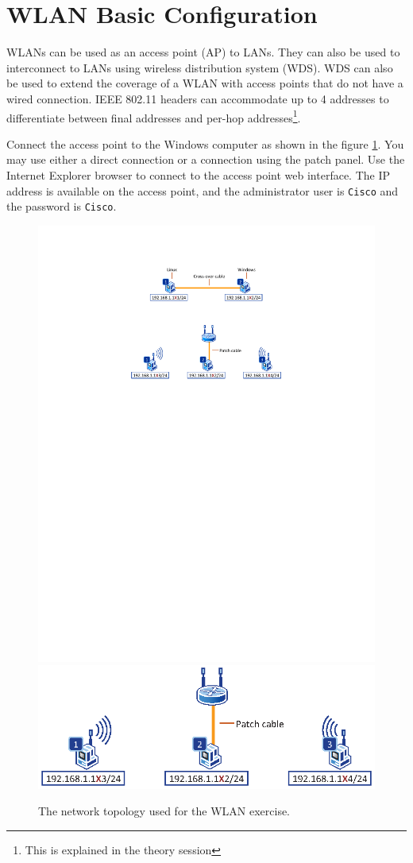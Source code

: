 \section{WLAN Basic Configuration}

WLANs can be used as an access point (AP) to LANs. They can also be used to interconnect to LANs using wireless distribution system (WDS).
WDS can also be used to extend the coverage of a WLAN with access points that do not have a wired connection.
IEEE 802.11 headers can accommodate up to 4 addresses to differentiate between final addresses and per-hop addresses\footnote{This is explained in the theory session}.

Connect the access point to the Windows computer as shown in the figure \ref{fig:Wlan}. You may use either a direct connection or a connection using the patch panel. Use the Internet Explorer browser to connect to the access point web interface. The IP address is available on the access point, and the administrator user is \texttt{\color{blue}Cisco} and the password is \texttt{\color{blue}Cisco}.

\begin{figure}
\centering
\ifpdf
\includegraphics[width=0.9\linewidth]{Figures/Wlan.pdf}
\else
\includegraphics[width=0.9\linewidth]{Figures/Wlan.eps}
\fi
\caption{The network topology used for the WLAN exercise.}
\label{fig:Wlan}
\end{figure}

